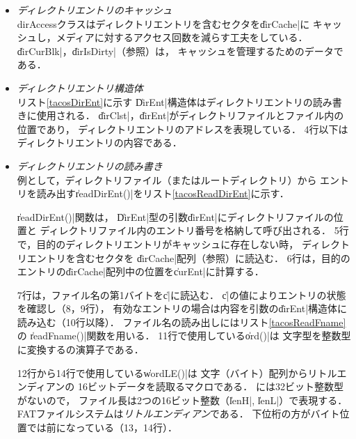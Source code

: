 \begin{itemize}
\item \emph{ディレクトリエントリのキャッシュ} \\
  dirAccessクラスはディレクトリエントリを含むセクタを\|dirCache|に
  キャッシュし，メディアに対するアクセス回数を減らす工夫をしている．
  \|dirCurBlk|，\|dirIsDirty|（参照）は，
  キャッシュを管理するためのデータである．

\item \emph{ディレクトリエントリ構造体} \\
  リスト\ref{tacosDirEnt}に示す
  \|DirEnt|構造体はディレクトリエントリの読み書きに使用される．
  \|dirClst|，\|dirEnt|がディレクトリファイルとファイル内の位置であり，
  ディレクトリエントリのアドレスを表現している．
  4行以下はディレクトリエントリの内容である．

  

\item \emph{ディレクトリエントリの読み書き} \\
  例として，ディレクトリファイル（またはルートディレクトリ）から
  エントリを読み出す\|readDirEnt()|をリスト\ref{tacosReadDirEnt}に示す．

  

  \|readDirEnt()|関数は，
  \|DirEnt|型の引数\|dirEnt|にディレクトリファイルの位置と
  ディレクトリファイル内のエントリ番号を格納して呼び出される．
  5行で，目的のディレクトリエントリがキャッシュに存在しない時，
  ディレクトリエントリを含むセクタを
  \|dirCache|配列（参照）に読込む．
  6行は，目的のエントリの\|dirCache|配列中の位置を\|curEnt|に計算する．

  7行は，ファイル名の第1バイトを\|c|に読込む．
  \|c|の値によりエントリの状態を確認し（8，9行），
  有効なエントリの場合は内容を引数の\|dirEnt|構造体に読み込む（10行以降）．
  ファイル名の読み出しにはリスト\ref{tacosReadFname}の
  \|readFname()|関数を用いる．
  11行で使用している\|ord()|は
  文字型を整数型に変換する{\cmml}の演算子である．

  12行から14行で使用している\|wordLE()|は
  文字（バイト）配列からリトルエンディアンの
  16ビットデータを読取るマクロである．
  {\cmml}には32ビット整数型がないので，
  ファイル長は2つの16ビット整数（\|lenH|, \|lenL|）で表現する．
  FATファイルシステムは\emph{リトルエンディアン}である．
  下位桁の方がバイト位置では前になっている（13，14行）．
\end{itemize}

